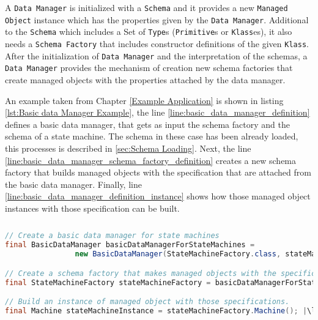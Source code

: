 A \texttt{Data Manager} is initialized with a \texttt{Schema} and it provides a new \texttt{Managed Object} instance which has the properties given by the \texttt{Data Manager}.
Additional to the \texttt{Schema} which includes a Set of \texttt{Type}s (\texttt{Primitive}s or \texttt{Klass}es), it also needs a \texttt{Schema Factory} that includes constructor definitions of the given \texttt{Klass}.
After the initialization of \texttt{Data Manager} and the interpretation of the schemas, a \texttt{Data Manager} provides the mechanism of creation new schema factories that create managed objects with the properties attached by the data manager.

An example taken from Chapter \ref{Example Application} is shown in listing \ref{lst:Basic data Manager Example}, the line \ref{line:basic_data_manager_definition} defines a basic data manager, that gets as input the schema factory and the schema of a state machine. 
The schema in these case has been already loaded, this processes is described in \ref{sec:Schema Loading}.
Next, the line \ref{line:basic_data_manager_schema_factory_definition} creates a new schema factory that builds managed objects with the specification that are attached from the basic data manager.
Finally, line \ref{line:basic_data_manager_definition_instance} shows how those managed object instances with those specification can be built.


\begin{sourcecode} [H]
	\begin{lstlisting}[language=Java, escapechar=|]
// Create a basic data manager for state machines
final BasicDataManager basicDataManagerForStateMachines = 
				new BasicDataManager(StateMachineFactory.class, stateMachineSchema); |\label{line:basic_data_manager_definition}|

// Create a schema factory that makes managed objects with the specifications of the basic data manager.
final StateMachineFactory stateMachineFactory = basicDataManagerForStateMachines.make(); |\label{line:basic_data_manager_schema_factory_definition}|

// Build an instance of managed object with those specifications.
final Machine stateMachineInstance = stateMachineFactory.Machine(); |\label{line:basic_data_manager_definition_instance}|
	\end{lstlisting}
	\caption{Basic data Manager Example}
	\label{lst:Basic data Manager Example}
\end{sourcecode}

